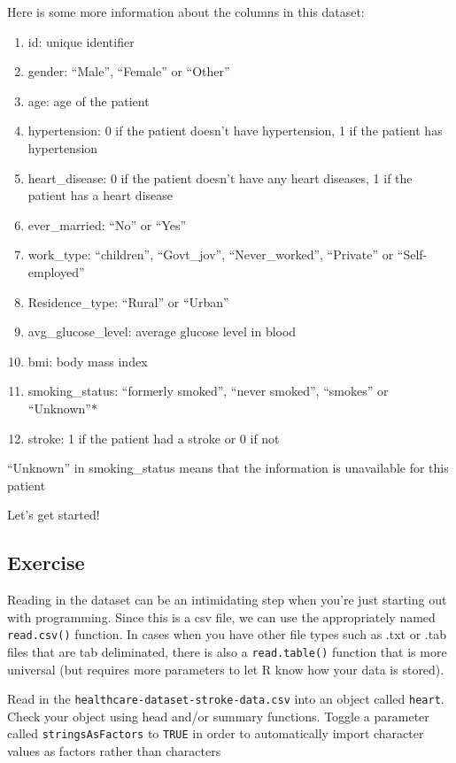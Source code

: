 \documentclass[
]{book}
\providecommand{\tightlist}{%
  \setlength{\itemsep}{0pt}\setlength{\parskip}{0pt}}
\begin{document}
Here is some more information about the columns in this dataset:

\begin{enumerate}
\def\labelenumi{\arabic{enumi})}
\tightlist
\item
  id: unique identifier
\item
  gender: ``Male'', ``Female'' or ``Other''
\item
  age: age of the patient
\item
  hypertension: 0 if the patient doesn't have hypertension, 1 if the patient has hypertension
\item
  heart\_disease: 0 if the patient doesn't have any heart diseases, 1 if the patient has a heart disease
\item
  ever\_married: ``No'' or ``Yes''
\item
  work\_type: ``children'', ``Govt\_jov'', ``Never\_worked'', ``Private'' or ``Self-employed''
\item
  Residence\_type: ``Rural'' or ``Urban''
\item
  avg\_glucose\_level: average glucose level in blood
\item
  bmi: body mass index
\item
  smoking\_status: ``formerly smoked'', ``never smoked'', ``smokes'' or ``Unknown''*
\item
  stroke: 1 if the patient had a stroke or 0 if not
\end{enumerate}

``Unknown'' in smoking\_status means that the information is unavailable for this patient

Let's get started!

\subsection{Exercise}\label{exercise-4}

Reading in the dataset can be an intimidating step when you're just starting out with programming. Since this is a csv file, we can use the appropriately named \texttt{read.csv()} function. In cases when you have other file types such as .txt or .tab files that are tab deliminated, there is also a \texttt{read.table()} function that is more universal (but requires more parameters to let R know how your data is stored).

Read in the \texttt{healthcare-dataset-stroke-data.csv} into an object called \texttt{heart}. Check your object using head and/or summary functions. Toggle a parameter called \texttt{stringsAsFactors} to \texttt{TRUE} in order to automatically import character values as factors rather than characters
\end{document}
